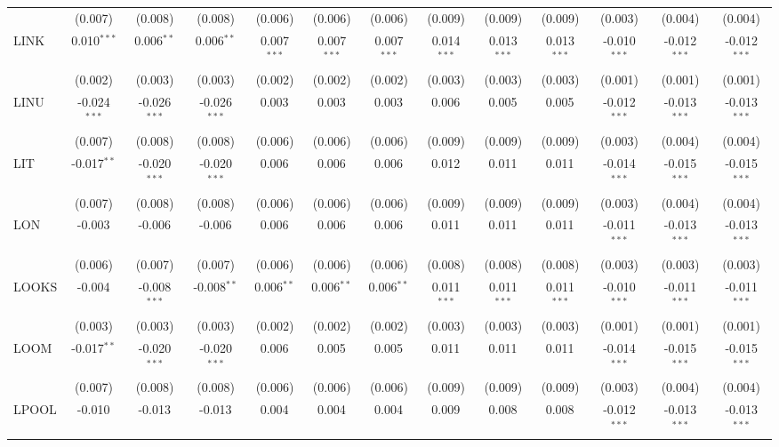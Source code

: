 \begin{table}[!htbp]
\begin{tabular}{@{\extracolsep{5pt}}lcccccccccccc}
  & (0.007) & (0.008) & (0.008) & (0.006) & (0.006) & (0.006) & (0.009) & (0.009) & (0.009) & (0.003) & (0.004) & (0.004) \\
 LINK & 0.010$^{***}$ & 0.006$^{**}$ & 0.006$^{**}$ & 0.007$^{***}$ & 0.007$^{***}$ & 0.007$^{***}$ & 0.014$^{***}$ & 0.013$^{***}$ & 0.013$^{***}$ & -0.010$^{***}$ & -0.012$^{***}$ & -0.012$^{***}$ \\
  & (0.002) & (0.003) & (0.003) & (0.002) & (0.002) & (0.002) & (0.003) & (0.003) & (0.003) & (0.001) & (0.001) & (0.001) \\
 LINU & -0.024$^{***}$ & -0.026$^{***}$ & -0.026$^{***}$ & 0.003$^{}$ & 0.003$^{}$ & 0.003$^{}$ & 0.006$^{}$ & 0.005$^{}$ & 0.005$^{}$ & -0.012$^{***}$ & -0.013$^{***}$ & -0.013$^{***}$ \\
  & (0.007) & (0.008) & (0.008) & (0.006) & (0.006) & (0.006) & (0.009) & (0.009) & (0.009) & (0.003) & (0.004) & (0.004) \\
 LIT & -0.017$^{**}$ & -0.020$^{***}$ & -0.020$^{***}$ & 0.006$^{}$ & 0.006$^{}$ & 0.006$^{}$ & 0.012$^{}$ & 0.011$^{}$ & 0.011$^{}$ & -0.014$^{***}$ & -0.015$^{***}$ & -0.015$^{***}$ \\
  & (0.007) & (0.008) & (0.008) & (0.006) & (0.006) & (0.006) & (0.009) & (0.009) & (0.009) & (0.003) & (0.004) & (0.004) \\
 LON & -0.003$^{}$ & -0.006$^{}$ & -0.006$^{}$ & 0.006$^{}$ & 0.006$^{}$ & 0.006$^{}$ & 0.011$^{}$ & 0.011$^{}$ & 0.011$^{}$ & -0.011$^{***}$ & -0.013$^{***}$ & -0.013$^{***}$ \\
  & (0.006) & (0.007) & (0.007) & (0.006) & (0.006) & (0.006) & (0.008) & (0.008) & (0.008) & (0.003) & (0.003) & (0.003) \\
 LOOKS & -0.004$^{}$ & -0.008$^{***}$ & -0.008$^{**}$ & 0.006$^{**}$ & 0.006$^{**}$ & 0.006$^{**}$ & 0.011$^{***}$ & 0.011$^{***}$ & 0.011$^{***}$ & -0.010$^{***}$ & -0.011$^{***}$ & -0.011$^{***}$ \\
  & (0.003) & (0.003) & (0.003) & (0.002) & (0.002) & (0.002) & (0.003) & (0.003) & (0.003) & (0.001) & (0.001) & (0.001) \\
 LOOM & -0.017$^{**}$ & -0.020$^{***}$ & -0.020$^{***}$ & 0.006$^{}$ & 0.005$^{}$ & 0.005$^{}$ & 0.011$^{}$ & 0.011$^{}$ & 0.011$^{}$ & -0.014$^{***}$ & -0.015$^{***}$ & -0.015$^{***}$ \\
  & (0.007) & (0.008) & (0.008) & (0.006) & (0.006) & (0.006) & (0.009) & (0.009) & (0.009) & (0.003) & (0.004) & (0.004) \\
 LPOOL & -0.010$^{}$ & -0.013$^{}$ & -0.013$^{}$ & 0.004$^{}$ & 0.004$^{}$ & 0.004$^{}$ & 0.009$^{}$ & 0.008$^{}$ & 0.008$^{}$ & -0.012$^{***}$ & -0.013$^{***}$ & -0.013$^{***}$ \\

\end{tabular}
\end{table}
